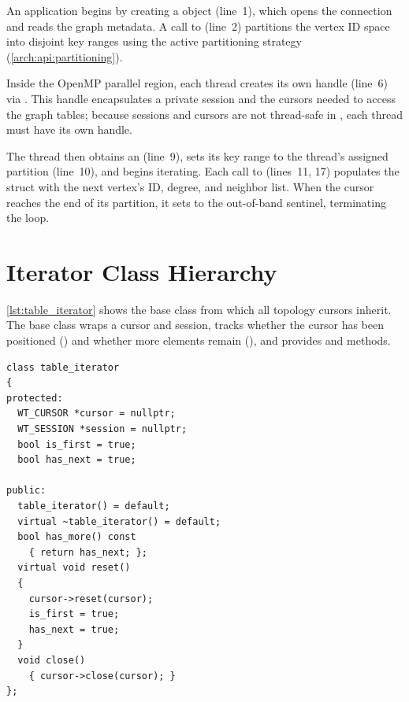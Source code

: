 An application begins by creating a  object (line~1), which opens the \wt{} connection and reads the graph metadata.
A call to  (line~2) partitions the vertex ID space into disjoint key ranges using the active partitioning strategy (\autoref{arch:api:partitioning}).

Inside the OpenMP parallel region, each thread creates its own  handle (line~6) via .
This handle encapsulates a private \wt{} session and the cursors needed to access the graph tables; because sessions and cursors are not thread-safe in \wt{}, each thread must have its own handle.

The thread then obtains an  (line~9), sets its key range to the thread's assigned partition (line~10), and begins iterating.
Each call to  (lines~11, 17) populates the  struct with the next vertex's ID, degree, and neighbor list.
When the cursor reaches the end of its partition, it sets  to the out-of-band sentinel, terminating the loop.

\section{Iterator Class Hierarchy}
\label{appendix:iterators}

\autoref{lst:table_iterator} shows the  base class from which all topology cursors inherit.
The base class wraps a \wt{} cursor and session, tracks whether the cursor has been positioned () and whether more elements remain (), and provides  and  methods.

\begin{lstlisting}[style=cpp,label={lst:table_iterator},caption={\code{table\_iterator} base class.},captionpos=b]
class table_iterator
{
protected:
  WT_CURSOR *cursor = nullptr;
  WT_SESSION *session = nullptr;
  bool is_first = true;
  bool has_next = true;

public:
  table_iterator() = default;
  virtual ~table_iterator() = default;
  bool has_more() const
    { return has_next; };
  virtual void reset()
  {
    cursor->reset(cursor);
    is_first = true;
    has_next = true;
  }
  void close()
    { cursor->close(cursor); }
};
\end{lstlisting}


